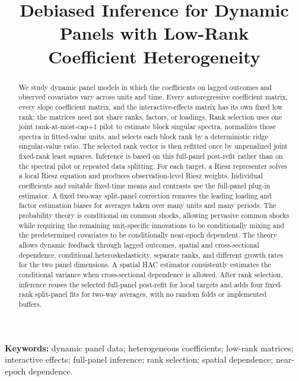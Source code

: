 \documentclass[11pt]{article}
\numberwithin{equation}{section}
\theoremstyle{remark}
\begin{document}
\title{Debiased Inference for Dynamic Panels with
Low-Rank \\ Coefficient Heterogeneity}
\author{}
\date{}
\maketitle

\begin{abstract}
We study dynamic panel models in which the coefficients on lagged outcomes and observed covariates vary across units and time. Every autoregressive coefficient matrix, every slope coefficient matrix, and the interactive-effects matrix has its own fixed low rank; the matrices need not share ranks, factors, or loadings. Rank selection uses one joint rank-at-most-cap+1 pilot to estimate block singular spectra, normalizes those spectra in fitted-value units, and selects each block rank by a deterministic ridge singular-value ratio. The selected rank vector is then refitted once by unpenalized joint fixed-rank least squares. Inference is based on this full-panel post-refit rather than on the spectral pilot or repeated data splitting. For each target, a Riesz representer solves a local Riesz equation and produces observation-level Riesz weights. Individual coefficients and suitable fixed-time means and contrasts use the full-panel plug-in estimator. A fixed two-way split-panel correction removes the leading loading and factor estimation biases for averages taken over many units and many periods. The probability theory is conditional on common shocks, allowing pervasive common shocks while requiring the remaining unit-specific innovations to be conditionally mixing and the predetermined covariates to be conditionally near-epoch dependent. The theory allows dynamic feedback through lagged outcomes, spatial and cross-sectional dependence, conditional heteroskedasticity, separate ranks, and different growth rates for the two panel dimensions. A spatial HAC estimator consistently estimates the conditional variance when cross-sectional dependence is allowed. After rank selection, inference reuses the selected full-panel post-refit for local targets and adds four fixed-rank split-panel fits for two-way averages, with no random folds or implemented buffers.
\end{abstract}

\noindent\textbf{Keywords:} dynamic panel data; heterogeneous coefficients; low-rank matrices; interactive effects; full-panel inference; rank selection; spatial dependence; near-epoch dependence.
\end{document}

